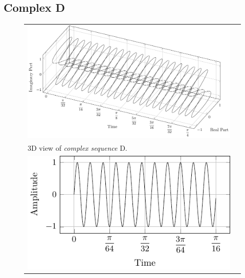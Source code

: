 \documentclass[../../course]{subfiles}
\begin{document}
\subsection{Complex D}

\begin{figure} [H]

    \renewcommand{\arraystretch}{0.75}
    \centering
    \begin{NiceTabularX} {\textwidth} {
            *{2}{>{\centering\arraybackslash}X}
        }

         {
             {
                \includegraphics[height = \textheight] {tikzpics/plotComplexD.pdf}
            }
        }

        &
        \\

         {
            \vbox{
                 {3D view of \emph{complex sequence} D.}
                \label{plt:cmplxD}
            }
        }

        &
        \\

         {
             {
                \includegraphics[height = \textheight] {tikzpics/plotShortX2.pdf}
            }
        }


\end{NiceTabularX}
\end{figure}
\end{document}
